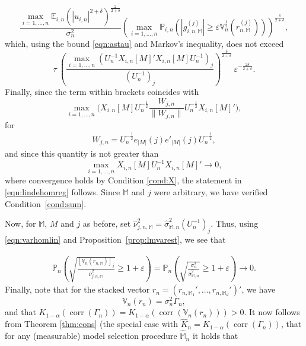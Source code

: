\documentclass[preprint]{imsart}
\newcommand{\eps}{\varepsilon}
\newcommand{\M}{\mathbb M}
\DeclareMathOperator{\corr}{corr}
\numberwithin{equation}{section}
\begin{document}
%
\begin{equation}
\frac{\max_{i = 1, \hdots, n} \mathbb{E}_{i,n} (|u_{i,n}|^{2+\delta})^{\frac{2}{2+\delta}}}{\sigma_n^2}\left( \max_{i = 1, \hdots, n} \mathbb{P}_{i,n} \left( | g_{i,n,\M}^{(j)}  | \geq \eps \mathbb{V}_n^{\frac{1}{2}}\left(r_{n,\M}^{(j)}\right) \right) \right)^{\frac{\delta}{2 + \delta}} ,
\end{equation}
%
which, using the bound \eqref{eqn:astau} and Markov's inequality, does not exceed
%
\begin{equation}\label{eq:thm:homlinmods:w2}
\tau ~ \left( 
\frac{\max_{i = 1, \hdots, n}  \left( U_n^{-1}X_{i,n}[M]'X_{i,n}[M]U_n^{-1}\right)_{j} }{ \left( U_n^{-1}\right)_{j}}
\right)^{\frac{\delta}{2 + \delta}} ~ \eps^{-\frac{2\delta}{2 + \delta}} .
\end{equation}
%
Finally, since the term within brackets coincides with
%
\begin{equation}
\max_{i = 1, \hdots, n} \bigg( X_{i,n}[M] U_n^{-\frac{1}{2}} \frac{W_{j,n}}{\|W_{j,n}\|} 
U_n^{-\frac{1}{2}} X_{i,n}[M]' \bigg),
\end{equation}
%
for 
%
\begin{align}
W_{j,n} = 
U_n^{-\frac{1}{2}} e_{|M|}(j) e'_{|M|}(j) U_n^{-\frac{1}{2}},
\end{align}
%
and since this quantity is not greater than
%
\begin{equation}
\max_{i = 1, \hdots, n} X_{i,n}[M]U_n^{-1} X_{i,n}[M]' \to 0,
\end{equation}
%
where convergence holds by Condition \ref{cond:X}, the statement in \eqref{eqn:lindehomreg} follows. Since $\M$ and $j$ were arbitrary, we have verified Condition~\ref{cond:sum}. 

Now, for $\M$, $M$ and $j$ as before, set $\hat{\nu}_{j,n,\M}^2 = \hat{\sigma}_{\M,n}^2 (U_n^{-1})_{j}$. Thus, using \eqref{eqn:varhomlin} and Proposition~\ref{prop:lmvarest}, we see that

\begin{align*}
\mathbb{P}_n \left( \sqrt{ \frac{[\mathbb{V}_n(r_{n,\M})]_j
}{\hat{\nu}_{j,n,\M}^2 }} \geq 1+\eps   \right) 
=
\mathbb{P}_n \left( \sqrt{ \frac{\sigma_n^2
}{\hat{\sigma}_{\M,n}^2 } } \geq 1+\eps   \right) 
\to 0.
\end{align*}
%
Finally, note that for the stacked vector $r_n = (r_{n,\M_1}',\dots, r_{n,\M_d}')'$, we have
%
\begin{equation}
\mathbb{V}_n(r_n) = \sigma_n^2 \Gamma_n, 
\end{equation}
%
and that $K_{1-\alpha}(\corr(\Gamma_n)) = K_{1-\alpha}(\corr(\mathbb{V}_n(r_n))) > 0$. It now follows from Theorem \ref{thm:cons} (the special case with $\hat{K}_n = K_{1-\alpha}(\corr(\Gamma_n))$, that for any (measurable) model selection procedure $\hat{\mathbb{M}}_n$ it holds that
\end{document}
